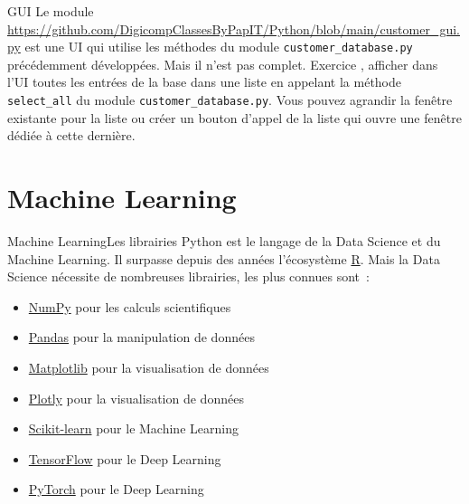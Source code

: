 \documentclass{beamer}
\begin{document}
    \begin{frame}{GUI}
        Le module \url{https://github.com/DigicompClassesByPapIT/Python/blob/main/customer_gui.py} est une UI qui utilise les méthodes du module \lstinline{customer_database.py} précédemment développées.
        Mais il n'est pas complet.
        \bigbreak
        Exercice \execcounterdispinc{}, afficher dans l'UI toutes les entrées de la base dans une liste en appelant la méthode \lstinline{select_all} du module \lstinline{customer_database.py}.
        Vous pouvez agrandir la fenêtre existante pour la liste ou créer un bouton d'appel de la liste qui ouvre une fenêtre dédiée à cette dernière.
    \end{frame}


    \section{Machine Learning}\label{sec:ml}

    \begin{frame}{Machine Learning}{Les librairies}
        Python est le langage de la Data Science et du Machine Learning.
        Il surpasse depuis des années l'écosystème \href{https://posit.co/download/rstudio-desktop/}{R}.
        \bigbreak
        Mais la Data Science nécessite de nombreuses librairies, les plus connues sont~:
        \begin{itemize}
            \item \href{https://numpy.org/}{NumPy} pour les calculs scientifiques
            \item \href{https://pandas.pydata.org/}{Pandas} pour la manipulation de données
            \item \href{https://matplotlib.org/}{Matplotlib} pour la visualisation de données
            \item \href{https://plotly.com/}{Plotly} pour la visualisation de données
            \item \href{https://scikit-learn.org/stable/}{Scikit-learn} pour le Machine Learning
            \item \href{https://www.tensorflow.org/}{TensorFlow} pour le Deep Learning
            \item \href{https://pytorch.org/}{PyTorch} pour le Deep Learning
        \end{itemize}
    \end{frame}
\end{document}
